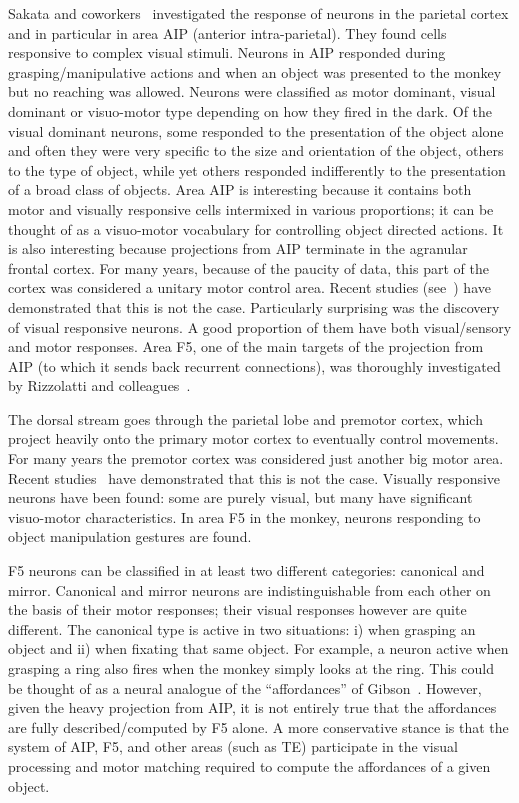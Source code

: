 Sakata and coworkers~\cite{sakata-taira-kusunoki-murata-tanaka-1997} 
investigated the response of neurons in the 
parietal cortex and in particular in area AIP (anterior intra-parietal). They found 
cells responsive to complex visual stimuli. Neurons in AIP responded during 
grasping/manipulative actions and when an object was presented to the 
monkey but no reaching was allowed. Neurons were classified as motor dominant, 
visual dominant or visuo-motor type depending on how they fired in the dark. Of 
the visual dominant neurons, some responded to the presentation of the 
object alone and often they were very specific to the size and orientation of the 
object, others to the type of object, while yet others responded indifferently to the 
presentation of a broad class of objects. Area AIP is interesting because 
it contains both motor and visually responsive cells intermixed in various proportions; 
it can be thought of as a visuo-motor vocabulary for controlling object directed 
actions. It is also interesting because projections from AIP terminate in the 
agranular frontal cortex. For many years, because of the paucity of data, this 
part of the cortex was considered a unitary motor control area. Recent studies 
(see~\cite{jeannerod97cognitive,fadiga00visuomotor}) have demonstrated 
that this is not the case. Particularly surprising was the discovery of visual 
responsive neurons. A good proportion of them have both visual/sensory and motor 
responses. Area F5, one of the main targets of the projection from AIP (to which 
it sends back recurrent connections), was thoroughly investigated by Rizzolatti 
and colleagues~\cite{gallese-fadiga-fogassi-rizzolatti-1996}.

%
%
\ifverbose
The dorsal stream goes through the parietal lobe and premotor cortex,
which project heavily onto the primary motor cortex to eventually
control movements. For many years the premotor cortex was considered
just another big motor area.  Recent studies~\cite{jeannerod97cognitive} have demonstrated that this is not the
case.  Visually responsive neurons have been found: some are purely
visual, but many have significant visuo-motor characteristics. In area
F5 in the monkey, neurons responding to object manipulation gestures
are found.  
\fi

F5 neurons can be classified in at least two different categories:
canonical and mirror.
Canonical and mirror neurons are 
indistinguishable from each other on the basis of their motor responses; 
their visual responses however are quite different. 
The canonical type is active in two situations:
i) when grasping an object and ii) when fixating that same object.
For example, a neuron active when grasping a ring also fires when the
monkey simply looks at the ring.  This could be thought of as a neural
analogue of the ``affordances'' of Gibson~\cite{gibson77theory}. 
However, given the heavy projection from AIP, it is not entirely
true that the affordances are fully described/computed by F5 alone.
A more conservative stance is that the system of AIP, F5, and other areas 
(such as TE) participate in the visual processing and motor matching required 
to compute the affordances of a given object.  

